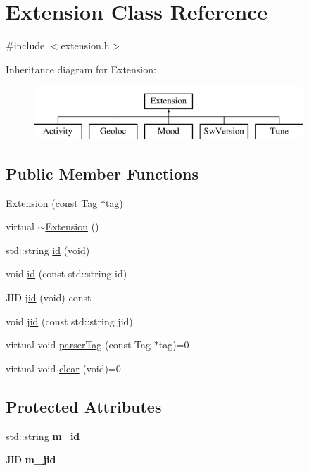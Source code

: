 \hypertarget{classExtension}{
\section{Extension Class Reference}
\label{classExtension}
}


{\ttfamily \#include $<$extension.h$>$}

Inheritance diagram for Extension:\begin{figure}[H]
\begin{center}
\leavevmode
\includegraphics[height=2.000000cm]{classExtension}
\end{center}
\end{figure}
\subsection*{Public Member Functions}
\begin{DoxyCompactItemize}
\item 
\hyperlink{classExtension_af0020afe7f1fb2526ada94896579d9b4}{Extension} (const Tag $\ast$tag)
\item 
virtual \hyperlink{classExtension_aac1049b89a95d8a2a2db62e29bb014ca}{$\sim$Extension} ()
\item 
std::string \hyperlink{classExtension_a92bcf7ea4ef0dc778e87f1ccc8c27351}{id} (void)
\item 
void \hyperlink{classExtension_a52a571a900cfedb14453f10831d408d7}{id} (const std::string id)
\item 
JID \hyperlink{classExtension_a47d1a1c66961799083e274e6bd5f8b7e}{jid} (void) const 
\item 
void \hyperlink{classExtension_a6bf36c4c9ed39270fc85b22c5b42ea6b}{jid} (const std::string jid)
\item 
virtual void \hyperlink{classExtension_a934ee9dd373d61a41ea98f919e9abcbd}{parserTag} (const Tag $\ast$tag)=0
\item 
virtual void \hyperlink{classExtension_a68a97599590365a07cb65b7146527de5}{clear} (void)=0
\end{DoxyCompactItemize}
\subsection*{Protected Attributes}
\begin{DoxyCompactItemize}
\item 
\hypertarget{classExtension_a1f8606d4bb02a963bbba84ce0715e853}{
std::string {\bfseries m\_\-id}}
\label{classExtension_a1f8606d4bb02a963bbba84ce0715e853}

\item 
\hypertarget{classExtension_a480e27b749148f8de33f147647df83cc}{
JID {\bfseries m\_\-jid}}
\label{classExtension_a480e27b749148f8de33f147647df83cc}

\end{DoxyCompactItemize}


